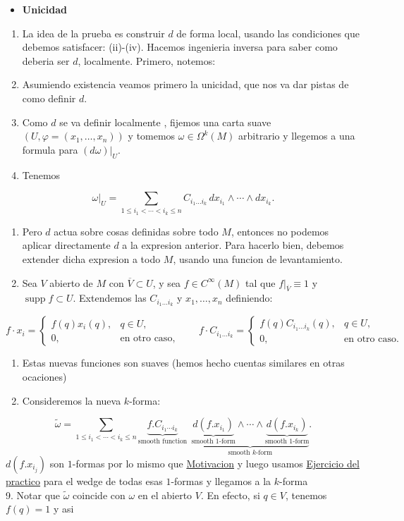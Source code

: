 \begin{bookproof}{}
\begin{itemize}
\item \textbf{Unicidad}
\end{itemize}
\begin{enumerate}
\item La idea de la prueba es construir $d$ de forma local, usando las condiciones que debemos satisfacer: (ii)-(iv). Hacemos ingenieria inversa para saber como deberia ser $d$, localmente. Primero, notemos:
\item Asumiendo existencia veamos primero la unicidad, que nos va dar pistas de como definir $d$.
\item Como $d$ se va definir localmente , fijemos una carta suave $(U,\varphi=(x_1,\ldots,x_n))$ y tomemos $\omega\in\Omega^k(M)$ arbitrario y llegemos a una formula para $(d\omega)|_U$.
\item Tenemos
\end{enumerate}
\[
\omega|_U=\sum_{1\le i_1<\cdots<i_k\le n}C_{i_1\ldots i_k}\,dx_{i_1}\wedge\cdots\wedge dx_{i_k}.
\]
\begin{enumerate}[start=5]
\item Pero $d$ actua sobre cosas definidas sobre todo $M$, entonces no podemos aplicar directamente $d$ a la expresion anterior. Para hacerlo bien, debemos extender dicha expresion a todo $M$, usando una funcion de levantamiento.
\item Sea $V$ abierto de $M$ con $\overline V\subset U$, y sea $f\in C^\infty(M)$ tal que $f|_{\overline V}\equiv1$ y $\operatorname{supp}f\subset U$. Extendemos las $C_{i_1\ldots i_k}$ y $x_1,\ldots,x_n$ definiendo:
\end{enumerate}
\[
f\cdot x_i=\begin{cases}f(q)x_i(q),&q\in U,\\0,&\text{en otro caso},\end{cases}\qquad f\cdot C_{i_1\ldots i_k}=\begin{cases}f(q)C_{i_1\ldots i_k}(q),&q\in U,\\0,&\text{en otro caso}.\end{cases}
\]
\begin{enumerate}[start=7]
\item Estas nuevas funciones son suaves (hemos hecho cuentas similares en otras ocaciones)
\item Consideremos la nueva $k$-forma:
\end{enumerate}
\[
\widetilde{\omega}=\sum_{1\le i_1<\cdots<i_k\le n}\underbrace{f.C_{i_1\cdots i_k}}_{\text{smooth function}}\ \ \underbrace{\underbrace{d(f.x_{i_1})}_{\text{smooth }1\text{-form}}\wedge\cdots\wedge\underbrace{d(f.x_{i_k})}_{\text{smooth }1\text{-form}}}_{\text{smooth }k\text{-form}}.
\]
$d(f.x_{i_{j}})$ son $1$-formas por lo mismo que \hyperref[blk:171d2a]{Motivacion} y luego usamos \hyperref[blk:ce25ad]{Ejercicio del practico} para el wedge de todas esas $1$-formas y llegamos a la $k$-forma\\
9. Notar que $\widetilde\omega$ coincide con $\omega$ en el abierto $V$. En efecto, si $q\in V$, tenemos $f(q)=1$ y asi


\end{bookproof}
